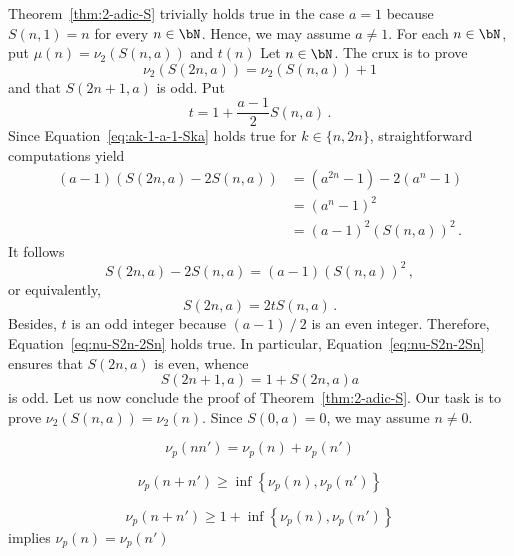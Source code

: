   Theorem~\ref{thm:2-adic-S} trivially holds true in the case $a = 1$ because $S(n, 1) = n$ for every $n \in \bN$.
  Hence, we may assume $a \ne 1$.
  For each $n \in \bN$, put $\mu(n) = \nu_2(S(n, a))$ and
  $t(n)$
  Let $n \in \bN$.
  The crux is to prove
  \begin{equation} \label{eq:nu-S2n-2Sn}
    \nu_2(S(2n, a)) = \nu_2(S(n, a)) + 1 
  \end{equation}
  and that $S(2n + 1, a)$ is odd.
  Put 
  $$
  t = 1 + \frac{a - 1}{2} S(n, a) \, . 
  $$
  Since Equation~\eqref{eq:ak-1-a-1-Ska} holds true for $k \in \{ n, 2n \}$, straightforward computations yield
  \begin{align*}
    (a - 1) \left( S(2 n, a) - 2 S(n, a) \right) & = (a^{2n} - 1) - 2(a^n - 1) \\
                                                 & = {(a^n - 1)}^2 \\
                                                 & = {(a - 1)}^2 \left( S(n, a) \right)^2\,.
  \end{align*}
  It follows 
  $$
  S(2 n, a) - 2 S(n, a) = (a - 1) \left(  S(n, a) \right)^2 \,, 
  $$
  or equivalently,
  $$
  S(2 n, a) = 2 t S(n, a) \, .
  $$
  Besides,  $t$ is an odd integer because $(a - 1) \mathbin{/} 2$ is an even integer.
  Therefore, Equation~\eqref{eq:nu-S2n-2Sn} holds true.
  In particular, Equation~\eqref{eq:nu-S2n-2Sn} ensures that $S(2n, a)$ is even, whence
  $$
  S(2n + 1, a) = 1 + S(2n, a) a
  $$
  is odd. %
  Let us now conclude the proof of Theorem~\ref{thm:2-adic-S}.
  Our task is to prove $\nu_2(S(n, a)) = \nu_2(n)$.
  Since $S(0, a) = 0$, we may assume $n \ne 0$.
  
  


$$
\nu_p(nn') = \nu_p(n) + \nu_p(n') 
$$

$$
\nu_p(n + n') \ge \inf \left\{ \nu_p(n), \nu_p(n') \right\} 
$$

$$
\nu_p(n + n') \ge 1 + \inf \left\{ \nu_p(n), \nu_p(n') \right\} 
$$
implies $\nu_p(n) = \nu_p(n')$

